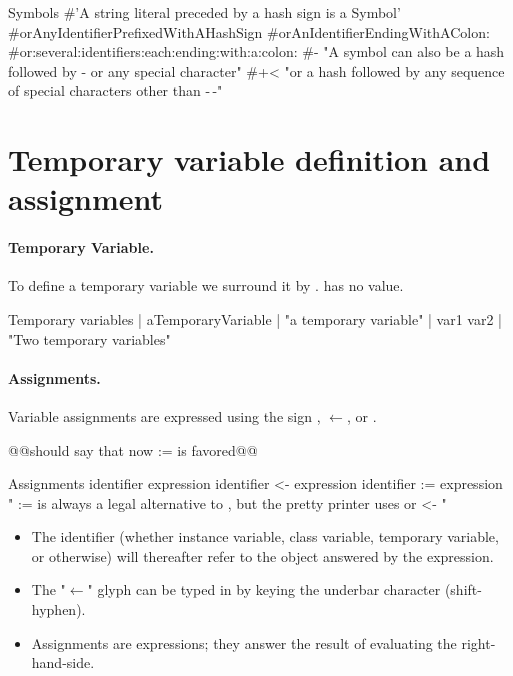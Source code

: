 \documentclass[a4paper,10pt,twoside]{book}
\begin{document}
\begin{script}{Symbols}
#'A string literal preceded by a hash sign is a Symbol'
#orAnyIdentifierPrefixedWithAHashSign
#orAnIdentifierEndingWithAColon:
#or:several:identifiers:each:ending:with:a:colon:
#- "A symbol can also be a hash followed by - or any special character"
#+< "or a hash followed by any sequence of special characters other than -\,-"
\end{script}



\section{Temporary variable definition and assignment}


\paragraph{Temporary Variable.} To define a temporary variable we surround it by \lct{|}. 
 has no value. 

\begin{script}{Temporary variables}
| aTemporaryVariable | "a temporary variable" 
| var1 var2 | "Two temporary variables" 
\end{script}

\paragraph{Assignments.}
Variable assignments are expressed using the sign \lct{\_}, $\leftarrow$, or \lct{:=}. 

@@should say that now := is favored@@
\begin{script}{Assignments}
identifier \lct{\_} expression
identifier <- expression
identifier :=  expression
" := is always a legal alternative to , but the pretty printer
 uses \lct{\_} or <- "
\end{script}

\begin{itemize}
\item The identifier (whether instance variable, class variable, temporary variable, or otherwise) will thereafter refer to the object answered by the expression.
\item The "$\leftarrow$" glyph can be typed in \sq by keying the underbar character (shift-hyphen).
\item Assignments are expressions; they answer the result of evaluating the right-hand-side.
\end{itemize}
\end{document}
